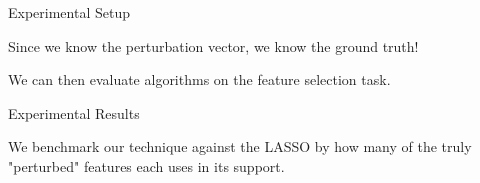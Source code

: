 \documentclass[svgnames,final]{beamer}
\begin{document}
\begin{frame}
\begin{columns}[T]
\begin{column}{.3\linewidth}
\begin{block}{Experimental Setup}
\begin{figure}[h]
		\end{figure}


		Since we know the perturbation vector, we know the ground truth!

		We can then evaluate algorithms on the feature selection task.

	\end{block}


	\begin{block}{Experimental Results}

		We benchmark our technique against the LASSO by how many of the truly "perturbed" features each uses in its support.


\end{block}
\end{column}
\end{columns}
\end{frame}
\end{document}
